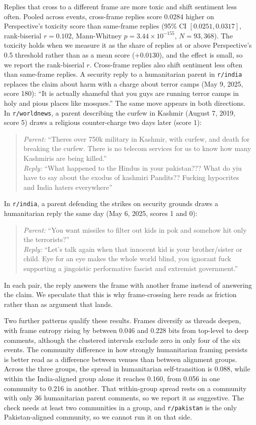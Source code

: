 Replies that cross to a different frame are more toxic and shift sentiment less often. Pooled across events, cross-frame replies score 0.0284 higher on Perspective's toxicity score than same-frame replies (95\% CI $[0.0251, 0.0317]$, rank-biserial $r = 0.102$, Mann-Whitney $p = 3.44 \times 10^{-155}$, $N = 93{,}368$). The toxicity holds when we measure it as the share of replies at or above Perspective's 0.5 threshold rather than as a mean score ($+0.0130$), and the effect is small, so we report the rank-biserial $r$. Cross-frame replies also shift sentiment less often than same-frame replies. A security reply to a humanitarian parent in \texttt{r/india} replaces the claim about harm with a charge about terror camps (May 9, 2025, score 180): ``It is actually shameful that you guys are running terror camps in holy and
pious places like mosques.'' The same move appears in both directions. In \texttt{r/worldnews}, a parent describing the curfew in Kashmir (August 7, 2019, score 5) draws a religious counter-charge two days later (score 1):
\begin{quote}
\emph{Parent:} ``Theres over 750k military in Kashmir, with curfew, and death for
breaking the curfew. There is no telecom services for us to know how many
Kashmiris are being killed.''\\[3pt]
\emph{Reply:} ``What happened to the Hindus in your pakistan??? What do yiu have
to say about the exodus of kashmiri Pandits?? Fucking hypocrites and India haters
everywhere''
\end{quote}
In \texttt{r/india}, a parent defending the strikes on security grounds draws a
humanitarian reply the same day (May 6, 2025, scores 1 and 0):
\begin{quote}
\emph{Parent:} ``You want missiles to filter out kids in pok and somehow hit only
the terrorists?''\\[3pt]
\emph{Reply:} ``Let's talk again when that innocent kid is your brother/sister or
child. Eye for an eye makes the whole world blind, you ignorant fuck supporting a
jingoistic performative fascist and extremist government.''
\end{quote}
In each pair, the reply answers the frame with another frame instead of answering the claim. We speculate that this is why frame-crossing here reads as friction
rather than as argument that lands.

Two further patterns qualify these results. Frames diversify as threads deepen, with frame entropy rising by between 0.046 and 0.228 bits from top-level to deep comments, although the clustered intervals exclude zero in only four of the six events. The community difference in how strongly humanitarian framing persists is better read as a difference between venues than between alignment groups. Across the three groups, the spread in humanitarian self-transition is 0.088, while within the India-aligned group alone it reaches 0.160, from 0.056 in one community to 0.216 in another. That within-group spread rests on a community with only 36 humanitarian parent comments, so we report it as suggestive. The check needs at least two communities in a group, and \texttt{r/pakistan} is the only Pakistan-aligned community, so we cannot run it on that side.


